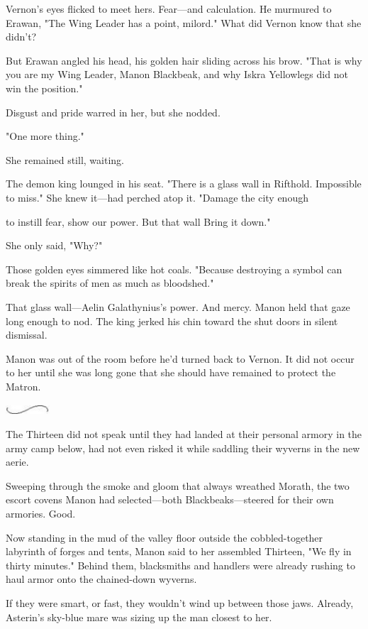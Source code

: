 Vernon's eyes flicked to meet hers. Fear---and calculation. He murmured to Erawan, "The Wing Leader has a point, milord." What did Vernon know that she didn't?

But Erawan angled his head, his golden hair sliding across his brow. "That is why you are my Wing Leader, Manon Blackbeak, and why Iskra Yellowlegs did not win the position."

Disgust and pride warred in her, but she nodded.

"One more thing."

She remained still, waiting.

The demon king lounged in his seat. "There is a glass wall in Rifthold. Impossible to miss." She knew it---had perched atop it. "Damage the city enough

to instill fear, show our power. But that wall  Bring it down."

She only said, "Why?"

Those golden eyes simmered like hot coals. "Because destroying a symbol can break the spirits of men as much as bloodshed."

That glass wall---Aelin Galathynius's power. And mercy. Manon held that gaze long enough to nod. The king jerked his chin toward the shut doors in silent dismissal.

Manon was out of the room before he'd turned back to Vernon. It did not occur to her until she was long gone that she should have remained to protect the Matron.

\includegraphics[width=0.65in,height=0.13in]{images/seperator}

The Thirteen did not speak until they had landed at their personal armory in the army camp below, had not even risked it while saddling their wyverns in the new aerie.

Sweeping through the smoke and gloom that always wreathed Morath, the two escort covens Manon had selected---both Blackbeaks---steered for their own armories. Good.

Now standing in the mud of the valley floor outside the cobbled-together labyrinth of forges and tents, Manon said to her assembled Thirteen, "We fly in thirty minutes." Behind them, blacksmiths and handlers were already rushing to haul armor onto the chained-down wyverns.

If they were smart, or fast, they wouldn't wind up between those jaws. Already, Asterin's sky-blue mare was sizing up the man closest to her.

